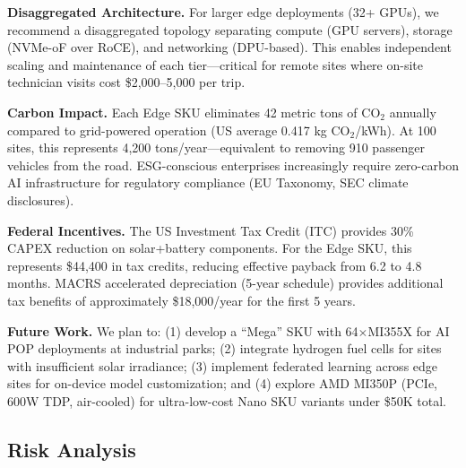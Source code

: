 \documentclass[conference,10pt,letterpaper]{IEEEtran}
\begin{document}
\textbf{Disaggregated Architecture.} For larger edge deployments (32+ GPUs), we recommend a disaggregated topology separating compute (GPU servers), storage (NVMe-oF over RoCE), and networking (DPU-based). This enables independent scaling and maintenance of each tier---critical for remote sites where on-site technician visits cost \$2,000--5,000 per trip.

\textbf{Carbon Impact.} Each Edge SKU eliminates 42 metric tons of CO$_2$ annually compared to grid-powered operation (US average 0.417 kg CO$_2$/kWh). At 100 sites, this represents 4,200 tons/year---equivalent to removing 910 passenger vehicles from the road. ESG-conscious enterprises increasingly require zero-carbon AI infrastructure for regulatory compliance (EU Taxonomy, SEC climate disclosures).

\textbf{Federal Incentives.} The US Investment Tax Credit (ITC) provides 30\% CAPEX reduction on solar+battery components. For the Edge SKU, this represents \$44,400 in tax credits, reducing effective payback from 6.2 to 4.8 months. MACRS accelerated depreciation (5-year schedule) provides additional tax benefits of approximately \$18,000/year for the first 5 years.

\textbf{Future Work.} We plan to: (1) develop a ``Mega'' SKU with 64$\times$MI355X for AI POP deployments at industrial parks; (2) integrate hydrogen fuel cells for sites with insufficient solar irradiance; (3) implement federated learning across edge sites for on-device model customization; and (4) explore AMD MI350P (PCIe, 600W TDP, air-cooled) for ultra-low-cost Nano SKU variants under \$50K total.



\subsection{Risk Analysis}

\begin{table}[!t]
\caption{Risk Assessment Matrix}
\label{tab:risk}
\centering\scriptsize
{}
\end{table}
\end{document}

